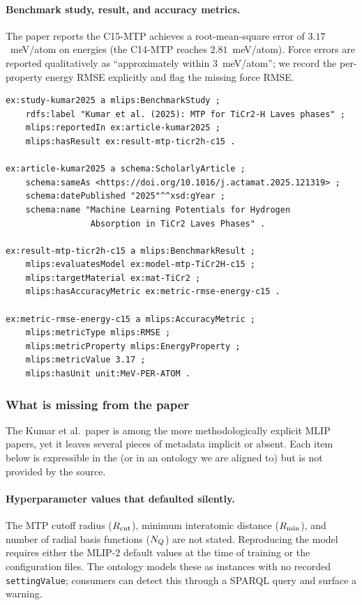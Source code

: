 \paragraph{Benchmark study, result, and accuracy metrics.}
The paper reports the C15-MTP achieves a root-mean-square error of
$3.17$~meV/atom on energies (the C14-MTP reaches $2.81$~meV/atom).
Force errors are reported qualitatively as ``approximately within
3~meV/atom''; we record the per-property energy RMSE explicitly and
flag the missing force RMSE.

\begin{lstlisting}[language=turtle,caption={Benchmark study and result.}]
ex:study-kumar2025 a mlips:BenchmarkStudy ;
    rdfs:label "Kumar et al. (2025): MTP for TiCr2-H Laves phases" ;
    mlips:reportedIn ex:article-kumar2025 ;
    mlips:hasResult ex:result-mtp-ticr2h-c15 .

ex:article-kumar2025 a schema:ScholarlyArticle ;
    schema:sameAs <https://doi.org/10.1016/j.actamat.2025.121319> ;
    schema:datePublished "2025"^^xsd:gYear ;
    schema:name "Machine Learning Potentials for Hydrogen
                 Absorption in TiCr2 Laves Phases" .

ex:result-mtp-ticr2h-c15 a mlips:BenchmarkResult ;
    mlips:evaluatesModel ex:model-mtp-TiCr2H-c15 ;
    mlips:targetMaterial ex:mat-TiCr2 ;
    mlips:hasAccuracyMetric ex:metric-rmse-energy-c15 .

ex:metric-rmse-energy-c15 a mlips:AccuracyMetric ;
    mlips:metricType mlips:RMSE ;
    mlips:metricProperty mlips:EnergyProperty ;
    mlips:metricValue 3.17 ;
    mlips:hasUnit unit:MeV-PER-ATOM .
\end{lstlisting}

\subsubsection{What is missing from the paper}
\label{sec:appendix-example-kumar2025-missing}

The Kumar et al.\ paper is among the more methodologically explicit
MLIP papers, yet it leaves several pieces of metadata implicit or
absent. Each item below is expressible in the \MLIPsOntology{} (or in
an ontology we are aligned to) but is not provided by the source.

\paragraph{Hyperparameter values that defaulted silently.}
The MTP cutoff radius ($R_{\mathrm{cut}}$), minimum interatomic distance
($R_{\mathrm{min}}$), and number of radial basis functions ($N_Q$) are
not stated. Reproducing the model requires either the MLIP-2 default
values at the time of training or the configuration files. The
ontology models these as \HyperparameterSettingC{} instances with no
recorded \texttt{settingValue}; consumers can detect this through a
SPARQL query and surface a warning.

